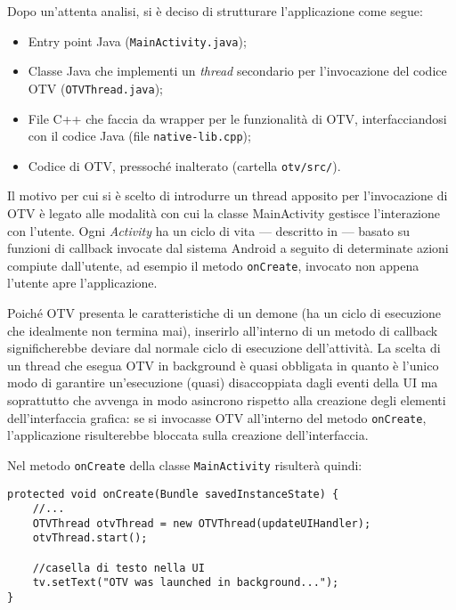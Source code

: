 Dopo un'attenta analisi, si è deciso di strutturare l'applicazione come segue:
\begin{itemize}
    \item Entry point Java (\texttt{MainActivity.java});
    \item Classe Java che implementi un \emph{thread} secondario per l'invocazione del codice OTV (\texttt{OTVThread.java});
    \item File C++ che faccia da wrapper per le funzionalità di OTV, interfacciandosi con il codice Java (file 
    \texttt{native-lib.cpp});
    \item Codice di OTV, pressoché inalterato (cartella \texttt{otv/src/}).
\end{itemize}

Il motivo per cui si è scelto di introdurre un thread apposito per l'invocazione di OTV è legato alle modalità con cui la 
classe MainActivity gestisce l'interazione con l'utente.
Ogni \textit{Activity} ha un ciclo di vita --- descritto in \cite{adev_lifecycle} --- basato su funzioni di callback invocate dal sistema
Android a seguito di determinate azioni compiute dall'utente, ad esempio il metodo \texttt{onCreate}, invocato non appena
l'utente apre l'applicazione.

Poiché OTV presenta le caratteristiche di un demone (ha un ciclo di esecuzione che idealmente non termina mai), inserirlo 
all'interno di un metodo di callback significherebbe deviare dal normale ciclo di esecuzione dell'attività.
La scelta di un thread che esegua OTV in background è quasi obbligata in quanto è l'unico modo di garantire un'esecuzione
(quasi) disaccoppiata dagli eventi della UI ma soprattutto che avvenga in modo asincrono rispetto alla creazione degli elementi
dell'interfaccia grafica: se si invocasse OTV all'interno del metodo \texttt{onCreate}, l'applicazione risulterebbe bloccata 
sulla creazione dell'interfaccia.

Nel metodo \texttt{onCreate} della classe \texttt{MainActivity} risulterà quindi:

\begin{verbatim}
protected void onCreate(Bundle savedInstanceState) {
    //...
    OTVThread otvThread = new OTVThread(updateUIHandler);
    otvThread.start();

    //casella di testo nella UI
    tv.setText("OTV was launched in background...");
}
\end{verbatim}

